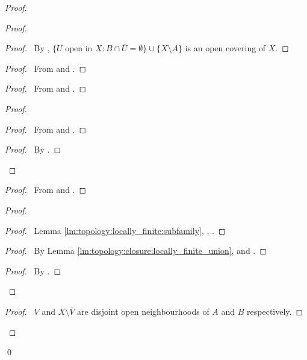 \begin{proof}
\begin{proof}
\begin{proof}
    \pf\ By , $\{ U \text{ open in } X : B \cap \overline{U} = \emptyset \} \cup \{ X \setminus A \}$ is an open covering of $X$.
  \end{proof}
  \begin{proof}
    \pf\ From  and .
  \end{proof}
  \begin{proof}
    \pf\ From  and .
  \end{proof}
  \begin{proof}
    \begin{proof}
      \pf\ From  and .
    \end{proof}
    \qedstep
    \begin{proof}
      \pf\ By .
    \end{proof}
  \end{proof}
  \begin{proof}
    \pf\ From  and .
  \end{proof}
  \begin{proof}
    \begin{proof}
      \pf\ Lemma \ref{lm:topology:locally_finite:subfamily}, , .
    \end{proof}
    \begin{proof}
      \pf\ By Lemma \ref{lm:topology:closure:locally_finite_union},  and .
    \end{proof}
    \qedstep
    \begin{proof}
      \pf\ By .
    \end{proof}
  \end{proof}
  \qedstep
  \begin{proof}
    \pf\ $V$ and $X \setminus \overline{V}$ are disjoint open neighbourhoods of $A$ and $B$ respectively.
  \end{proof}
\end{proof}
\qed
\end{proof}

